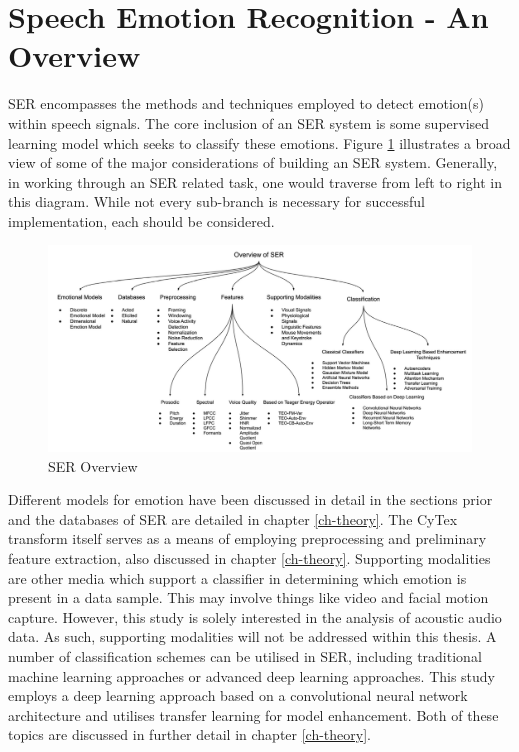 \section{Speech Emotion Recognition - An Overview}
SER encompasses the methods and techniques employed to detect emotion(s) within speech signals. The core inclusion of an SER system is some supervised learning model which seeks to classify these emotions. Figure \ref{ser_branch_fig} illustrates a broad view of some of the major considerations of building an SER system. Generally, in working through an SER related task, one would traverse from left to right in this diagram. While not every sub-branch is necessary for successful implementation, each should be considered.
\begin{figure}[h]
        \hspace{-1cm}
        \includegraphics[scale = 1.0]{images/SER Overview Map.png}
        \caption{SER Overview \cite{surveyCORE1}}
        \label{ser_branch_fig}
\end{figure}
 Different models for emotion have been discussed in detail in the sections prior and the databases of SER are detailed in chapter \ref{ch-theory}. The CyTex transform itself serves as a means of employing preprocessing and preliminary feature extraction, also discussed in chapter \ref{ch-theory}. Supporting modalities are other media which support a classifier in determining which emotion is present in a data sample. This may involve things like video and facial motion capture. However, this study is solely interested in the analysis of acoustic audio data. As such, supporting modalities will not be addressed within this thesis. A number of classification schemes can be utilised in SER, including traditional machine learning approaches or advanced deep learning approaches. This study employs a deep learning approach based on a convolutional neural network architecture and utilises transfer learning for model enhancement. Both of these topics are discussed in further detail in chapter \ref{ch-theory}.\\ \\
